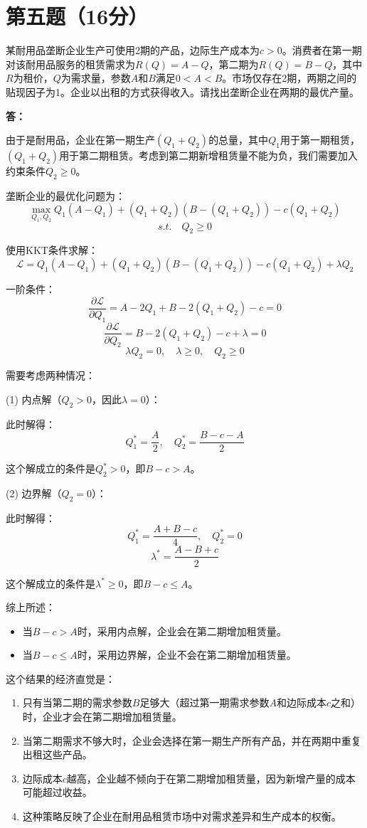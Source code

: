 \documentclass[12pt]{article}
\begin{document}
\section*{第五题（16分）}
某耐用品垄断企业生产可使用2期的产品，边际生产成本为$c>0$。消费者在第一期对该耐用品服务的租赁需求为$R(Q)=A-Q$，第二期为$R(Q)=B-Q$，其中$R$为租价，$Q$为需求量，参数$A$和$B$满足$0<A<B$。市场仅存在2期，两期之间的贴现因子为1。企业以出租的方式获得收入。请找出垄断企业在两期的最优产量。

\noindent \textbf{答：}

由于是耐用品，企业在第一期生产$(Q_1+Q_2)$的总量，其中$Q_1$用于第一期租赁，$(Q_1+Q_2)$用于第二期租赁。考虑到第二期新增租赁量不能为负，我们需要加入约束条件$Q_2\geq0$。

垄断企业的最优化问题为：
\[\max_{Q_1,Q_2} Q_1(A-Q_1) + (Q_1+Q_2)(B-(Q_1+Q_2)) - c(Q_1+Q_2)\]
\[s.t. \quad Q_2\geq0\]

使用KKT条件求解：
\[\mathcal{L} = Q_1(A-Q_1) + (Q_1+Q_2)(B-(Q_1+Q_2)) - c(Q_1+Q_2) + \lambda Q_2\]

一阶条件：
\[\frac{\partial \mathcal{L}}{\partial Q_1} = A-2Q_1 + B-2(Q_1+Q_2) - c = 0\]
\[\frac{\partial \mathcal{L}}{\partial Q_2} = B-2(Q_1+Q_2) - c + \lambda = 0\]
\[\lambda Q_2 = 0, \quad \lambda\geq0, \quad Q_2\geq0\]

需要考虑两种情况：

(1) 内点解（$Q_2>0$，因此$\lambda=0$）：

此时解得：
\[Q_1^* = \frac{A}{2}, \quad Q_2^* = \frac{B-c-A}{2}\]

这个解成立的条件是$Q_2^*>0$，即$B-c>A$。

(2) 边界解（$Q_2=0$）：

此时解得：
\[Q_1^* = \frac{A+B-c}{4}, \quad Q_2^* = 0\]
\[\lambda^* = \frac{A-B+c}{2}\]

这个解成立的条件是$\lambda^*\geq0$，即$B-c\leq A$。

综上所述：
\begin{itemize}
\item 当$B-c>A$时，采用内点解，企业会在第二期增加租赁量。
\item 当$B-c\leq A$时，采用边界解，企业不会在第二期增加租赁量。
\end{itemize}

这个结果的经济直觉是：
\begin{enumerate}
\item 只有当第二期的需求参数$B$足够大（超过第一期需求参数$A$和边际成本$c$之和）时，企业才会在第二期增加租赁量。
\item 当第二期需求不够大时，企业会选择在第一期生产所有产品，并在两期中重复出租这些产品。
\item 边际成本$c$越高，企业越不倾向于在第二期增加租赁量，因为新增产量的成本可能超过收益。
\item 这种策略反映了企业在耐用品租赁市场中对需求差异和生产成本的权衡。
\end{enumerate}
\end{document}
